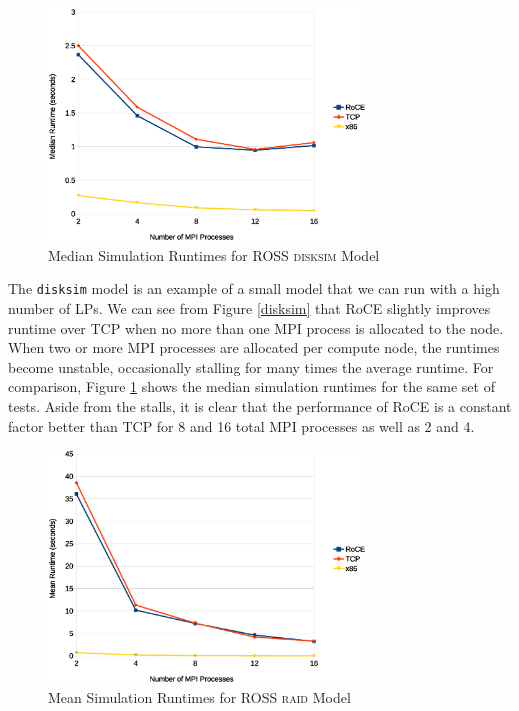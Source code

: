 \documentclass[11pt]{book}
\begin{document}
\begin{figure}
\centering
\includegraphics[width=0.75\textwidth]{disksim_median}
\caption{Median Simulation Runtimes for ROSS \textsc{disksim} Model}
\label{disksim-median}
\end{figure}

The \verb;disksim; model is an example of a small model that we can run with a high number
of LPs.  We can see from Figure \ref{disksim} that RoCE slightly improves runtime over TCP
when no more than one MPI process is allocated to the node.  When two or more MPI
processes are allocated per compute node, the runtimes become unstable, occasionally
stalling for many times the average runtime.  For comparison, Figure \ref{disksim-median}
shows the median simulation runtimes for the same set of tests.  Aside from the stalls, it
is clear that the performance of RoCE is a constant factor better than TCP for 8 and 16
total MPI processes as well as 2 and 4.

\begin{figure}
\centering
\includegraphics[width=0.75\textwidth]{raid}
\caption{Mean Simulation Runtimes for ROSS \textsc{raid} Model}
\label{raid}
\end{figure}
\end{document}

